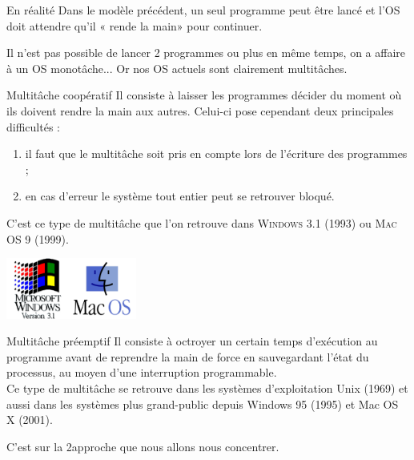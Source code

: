 \documentclass[10pt]{beamer}
\begin{document}
\begin{frame}{En réalité}
Dans le modèle précédent, un seul programme peut être lancé et l'OS doit attendre qu'il « rende la main» pour continuer.\\\pause

Il n'est pas possible de lancer 2 programmes ou plus en même temps, on a affaire à un OS \alert{monotâche}... Or nos OS actuels sont clairement multitâches.
\end{frame}
\begin{frame}{Multitâche coopératif}
Il consiste à laisser les programmes décider du moment où ils doivent rendre la main aux autres. Celui-ci pose cependant deux principales difficultés :\pause
\begin{enumerate}[--]
	\item il faut que le multitâche soit pris en compte lors de l'écriture des programmes ;\pause
    \item en cas d'erreur le système tout entier peut se retrouver bloqué.\pause
\end{enumerate}
C'est ce type de multitâche que l'on retrouve dans \textsc{Windows 3.1} (1993) ou \textsc{Mac OS 9} (1999).\\
\begin{center}
\includegraphics[height=2cm]{img/win31}\hspace{2cm}\includegraphics[height=2cm]{img/macos}
\end{center}
\end{frame}
\begin{frame}{Multitâche préemptif}
Il consiste à octroyer un certain temps d'exécution au programme avant de reprendre la main de force en sauvegardant l'état du processus, au moyen d'une interruption programmable.\\\pause
Ce type de multitâche se retrouve dans les systèmes d'exploitation Unix (1969) et aussi dans les systèmes plus grand-public depuis Windows 95 (1995) et Mac OS X (2001).\\\pause

C'est sur la 2\eme approche que nous allons nous concentrer.
\end{frame}
\end{document}
